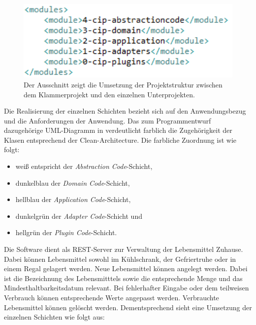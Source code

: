 \begin{figure}[H]
	\centering
	\includegraphics[width=1.0\textwidth]{Bilder/ausschnitt-pom.PNG}
	\caption[Ausschnitt aus der pom.xml zur Projektstruktur.]{Der Ausschnitt zeigt die Umsetzung der Projektstruktur zwischen dem Klammerprojekt und den einzelnen Unterprojekten.}
	\label{fig:umsetzung-pom}
\end{figure}

Die Realisierung der einzelnen Schichten bezieht sich auf den Anwendungsbezug und die Anforderungen der Anwendung.
Das zum Programmentwurf dazugehörige UML-Diagramm in  verdeutlicht farblich die Zugehörigkeit der Klasen entsprechend der Clean-Architecture.
Die farbliche Zuordnung ist wie folgt:
\begin{itemize}
    \item weiß entspricht der \textit{Abstraction Code}-Schicht,
    \item dunkelblau der \textit{Domain Code}-Schicht,
    \item hellblau der \textit{Application Code}-Schicht,
    \item dunkelgrün der \textit{Adapter Code}-Schicht und
    \item hellgrün der \textit{Plugin Code}-Schicht.
\end{itemize}


Die Software dient als \ac{REST}-Server zur Verwaltung der Lebensmittel Zuhause.
Dabei können Lebensmittel sowohl im Kühlschrank, der Gefriertruhe oder in einem Regal gelagert werden.
Neue Lebensmittel können angelegt werden.
Dabei ist die Bezeichnung des Lebensmitttels sowie die entsprechende Menge und das Mindesthaltbarkeitsdatum relevant.
Bei fehlerhafter Eingabe oder dem teilweisen Verbrauch können entsprechende Werte angepasst werden.
Verbrauchte Lebensmittel können gelöscht werden.
Dementsprechend sieht eine Umsetzung der einzelnen Schichten wie folgt aus:


